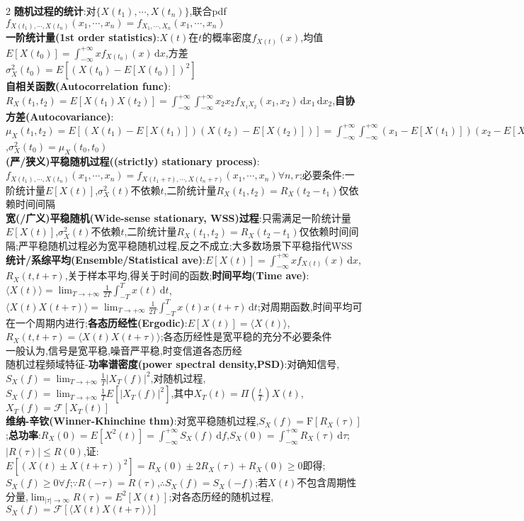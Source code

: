 \documentclass[UTF8,a4paper,10pt]{article}
\providecommand{\abs}[1]{\left\lvert#1\right\rvert}
\begin{document}
\begin{multicols}{2}
    \textbf{随机过程的统计}:对$\{X(t_1),\cdots,X(t_n)\}$,联合pdf$f_{X(t_1),\cdots,X(t_n)}(x_1,\cdots,x_n)=f_{X_1,\cdots,X_n}(x_1,\cdots,x_n)$\\
    \textbf{一阶统计量(1st order statistics)}:$X(t)$在$t$的概率密度$f_{X(t)}(x)$,均值$E[X(t_0)]=\int_{-\infty}^{+\infty}xf_{X(t_0)}(x)\,\mathrm{d}x$,方差$\sigma_X^2(t_0)=E[(X(t_0)-E[X(t_0)])^2]$\\
    \textbf{自相关函数(Autocorrelation func)}:$R_X(t_1,t_2)=E[X(t_1)X(t_2)]=\int_{-\infty}^{+\infty}\int_{-\infty}^{+\infty}x_2x_2f_{X_1X_2}(x_1,x_2)\,\mathrm{d}x_1\,\mathrm{d}x_2$,\textbf{自协方差(Autocovariance)}:$\mu_X(t_1,t_2)=E[(X(t_1)-E[X(t_1)])(X(t_2)-E[X(t_2)])]=\int_{-\infty}^{+\infty}\int_{-\infty}^{+\infty}(x_1-E[X(t_1)])(x_2-E[X(t_2)])f_{X_1X_2}(x_1,x_2)\,\mathrm{d}x_1\,\mathrm{d}x_2=R_X(t_1,t_2)-E[X(t_1)]E[X(t_2)]$,$\sigma_X^2(t_0)=\mu_X(t_0,t_0)$\\
    \textbf{(严/狭义)平稳随机过程((strictly) stationary process)}:$f_{X(t_1),\cdots,X(t_n)}(x_1,\cdots,x_n)=f_{X(t_1+\tau),\cdots,X(t_n+\tau)}(x_1,\cdots,x_n)\forall n,r$;必要条件:一阶统计量$E[X(t)]$,$\sigma_X^2(t)$不依赖$t$,二阶统计量$R_X(t_1,t_2)=R_X(t_2-t_1)$仅依赖时间间隔\\
    \textbf{宽(/广义)平稳随机(Wide-sense stationary, WSS)过程}:只需满足一阶统计量$E[X(t)]$,$\sigma_X^2(t)$不依赖$t$,二阶统计量$R_X(t_1,t_2)=R_X(t_2-t_1)$仅依赖时间间隔;严平稳随机过程必为宽平稳随机过程,反之不成立;大多数场景下平稳指代WSS\\
    \textbf{统计/系综平均(Ensemble/Statistical ave)}:$E[X(t)]=\int_{-\infty}^{+\infty}xf_{X(t)}(x)\,\mathrm{d}x$,$R_X(t,t+\tau)$,关于样本平均,得关于时间的函数;\textbf{时间平均(Time ave)}:$\langle X(t)\rangle=\lim_{T\rightarrow+\infty}\frac{1}{2T}\int_{-T}^Tx(t)\,\mathrm{d}t$,$\langle X(t)X(t+\tau)\rangle=\lim_{T\rightarrow+\infty}\frac{1}{2T}\int_{-T}^Tx(t)x(t+\tau)\,\mathrm{d}t$;对周期函数,时间平均可在一个周期内进行;\textbf{各态历经性(Ergodic)}:$E[X(t)]=\langle X(t)\rangle$,$R_X(t,t+\tau)=\langle X(t)X(t+\tau)\rangle$;各态历经性是宽平稳的充分不必要条件\\
    一般认为,信号是宽平稳,噪音严平稳,时变信道各态历经\\
    随机过程频域特征-\textbf{功率谱密度(power spectral density,PSD)}:对确知信号,$S_X(f)=\lim_{T\rightarrow+\infty}\frac{1}{T}\abs{X_T(f)}^2$,对随机过程,$S_X(f)=\lim_{T\rightarrow+\infty}\frac{1}{T}E[\abs{X_T(f)}^2]$,其中$X_T(t)=\Pi(\frac{t}{T})X(t)$,$X_T(f)=\mathscr{F}[X_T(t)]$\\
    \textbf{维纳-辛钦(Winner-Khinchine thm)}:对宽平稳随机过程,$S_X(f)=\mathrm{F}[R_X(\tau)]$;\textbf{总功率}:$R_X(0)=E[X^2(t)]=\int_{-\infty}^{+\infty}S_X(f)\,\mathrm{d}f$,$S_X(0)=\int_{-\infty}^{+\infty}R_X(\tau)\,\mathrm{d}\tau$;$\abs{R(\tau)}\leq R(0)$,证:$E[(X(t)\pm X(t+\tau))^2]=R_X(0)\pm 2R_X(\tau)+R_X(0)\geq 0$即得;$S_X(f)\geq 0\forall f$;$\because R(-\tau)=R(\tau)$,$\therefore S_X(f)=S_X(-f)$;若$X(t)$不包含周期性分量,$\lim_{\abs{\tau}\rightarrow\infty}R(\tau)=E^2[X(t)]$;对各态历经的随机过程,$S_X(f)=\mathscr{F}[\langle X(t)X(t+\tau)\rangle]$\\

\end{multicols}
\end{document}
